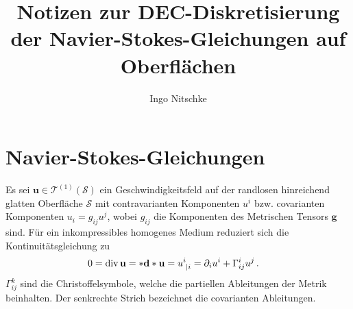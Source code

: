\documentclass[a4paper,11pt]{scrartcl}
\title{Notizen zur DEC-Diskretisierung der Navier-Stokes-Gleichungen auf Oberflächen}
\author{Ingo Nitschke}
\newcommand{\U}{u} %
\newcommand{\Ub}{\mathbf{\U}} %
\newcommand{\g}{\mathbf{g}} %
\newcommand{\surf}{\mathcal{S}} %
\newcommand{\uspace}{\mathcal{T}^{(1)}(\surf)} %
\renewcommand{\div}{\operatorname{div}} %
\newcommand{\exd}{\mathbf{d}} %
\newcommand{\formPeriod}{\,\text{.}}
\begin{document}
\maketitle
\tableofcontents

\section{Navier-Stokes-Gleichungen}

Es sei \( \Ub\in\uspace \) ein Geschwindigkeitsfeld auf der randlosen hinreichend glatten Oberfläche \( \surf \) mit contravarianten Komponenten
\( \U^{i} \) bzw. covarianten Komponenten \( \U_{i} = g_{ij}\U^{j} \), 
wobei \( g_{ij} \) die Komponenten des Metrischen Tensors \( \g \) sind.
Für ein inkompressibles homogenes Medium reduziert sich die Kontinuitätsgleichung zu 
\begin{align}\label{eq:konti}
  0 &= \div\Ub = *\exd*\Ub = \tensor{\U}{^{i}_{|i}} = \partial_{i}\U^{i} + \Gamma_{ij}^{i}\U^{j} \formPeriod
\end{align}
\( \Gamma_{ij}^{k} \) sind die Christoffelsymbole, welche die partiellen Ableitungen der Metrik beinhalten.
Der senkrechte Strich bezeichnet die covarianten Ableitungen.
\end{document}
